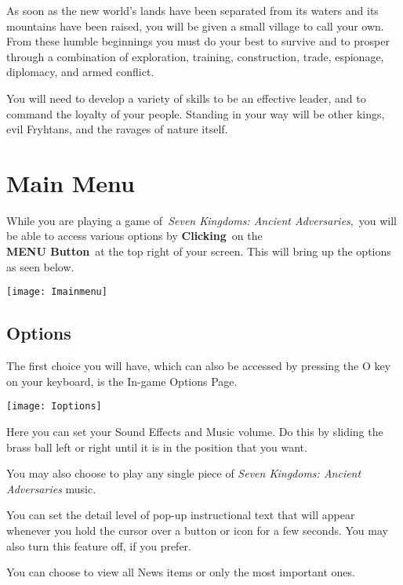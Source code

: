 As soon as the new world’s lands have been separated from its waters and its mountains have been raised, you will be given a small village to call your own. From these humble beginnings you must do your best to survive and to prosper through a combination of exploration, training, construction, trade, espionage, diplomacy, and armed conflict.

You will need to develop a variety of skills to be an effective leader, and to command the loyalty of your people. Standing in your way will be other kings, evil Fryhtans, and the ravages of nature itself.

\section{Main Menu}

While you are playing a game of \textit{Seven Kingdoms: Ancient Adversaries}, you will be able to access various options by \textbf{Clicking} on the \\ %
\textbf{MENU Button} at the top right of your screen. This will bring up the options as seen below.

\begin{center}
\texttt{[image: Imainmenu]}
\end{center}

\subsection{Options}

The first choice you will have, which can also be accessed by pressing the O key on your keyboard, is the In-game Options Page.

\begin{center}
	\texttt{[image: Ioptions]}
\end{center}

Here you can set your Sound Effects and Music volume. Do this by sliding the brass ball left or right until it is in the position that you want.

You may also choose to play any single piece of \textit{Seven Kingdoms: Ancient Adversaries} music.

You can set the detail level of pop-up instructional text that will appear whenever you hold the cursor over a button or icon for a few seconds. You may also turn this feature off, if you prefer.

You can choose to view all News items or only the most important ones.


